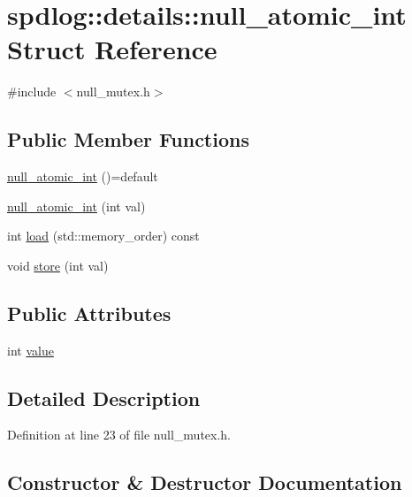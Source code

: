 \hypertarget{structspdlog_1_1details_1_1null__atomic__int}{}\section{spdlog\+:\+:details\+:\+:null\+\_\+atomic\+\_\+int Struct Reference}
\label{structspdlog_1_1details_1_1null__atomic__int}


{\ttfamily \#include $<$null\+\_\+mutex.\+h$>$}

\subsection*{Public Member Functions}
\begin{DoxyCompactItemize}
\item 
\hyperlink{structspdlog_1_1details_1_1null__atomic__int_af41bb35b91f4a0195ab1cd8688fc1ccc}{null\+\_\+atomic\+\_\+int} ()=default
\item 
\hyperlink{structspdlog_1_1details_1_1null__atomic__int_aa9856518fa8bc88f466b2b9c17bff1b9}{null\+\_\+atomic\+\_\+int} (int val)
\item 
int \hyperlink{structspdlog_1_1details_1_1null__atomic__int_a6b7a8489e34705db8d07b44f204a7c2f}{load} (std\+::memory\+\_\+order) const
\item 
void \hyperlink{structspdlog_1_1details_1_1null__atomic__int_a75c74956220ca5cc82a4eedcd9aa854f}{store} (int val)
\end{DoxyCompactItemize}
\subsection*{Public Attributes}
\begin{DoxyCompactItemize}
\item 
int \hyperlink{structspdlog_1_1details_1_1null__atomic__int_ab433069a53cdd1402dc7b0b942d7095f}{value}
\end{DoxyCompactItemize}


\subsection{Detailed Description}


Definition at line 23 of file null\+\_\+mutex.\+h.



\subsection{Constructor \& Destructor Documentation}
\mbox{\label{structspdlog_1_1details_1_1null__atomic__int_af41bb35b91f4a0195ab1cd8688fc1ccc}} 
